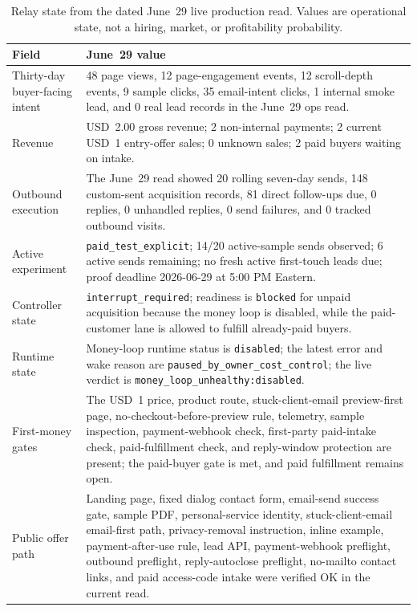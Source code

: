 \documentclass[12pt,letterpaper]{article}
\begin{document}
\begin{table}[tbp]
\centering
\small
\caption{Relay state from the dated June~29 live production read. Values are operational state, not a hiring, market, or profitability probability.}
\label{tab:current_state}
\begin{tabularx}{\textwidth}{L{0.27\textwidth}Y}
\toprule
{}
\textbf{Field} & \textbf{June~29 value} \\
\midrule
Thirty-day buyer-facing intent & 48 page views, 12 page-engagement events, 12 scroll-depth events, 9 sample clicks, 35 email-intent clicks, 1 internal smoke lead, and 0 real lead records in the June~29 ops read. \\
Revenue & USD~2.00 gross revenue; 2 non-internal payments; 2 current USD~1 entry-offer sales; 0 unknown sales; 2 paid buyers waiting on intake. \\
Outbound execution & The June~29 read showed 20 rolling seven-day sends, 148 custom-sent acquisition records, 81 direct follow-ups due, 0 replies, 0 unhandled replies, 0 send failures, and 0 tracked outbound visits. \\
Active experiment & \texttt{paid\_test\_explicit}; 14/20 active-sample sends observed; 6 active sends remaining; no fresh active first-touch leads due; proof deadline 2026-06-29 at 5:00 PM Eastern. \\
Controller state & \texttt{interrupt\_required}; readiness is \texttt{blocked} for unpaid acquisition because the money loop is disabled, while the paid-customer lane is allowed to fulfill already-paid buyers. \\
Runtime state & Money-loop runtime status is \texttt{disabled}; the latest error and wake reason are \texttt{paused\_by\_owner\_cost\_control}; the live verdict is \texttt{money\_loop\_unhealthy:disabled}. \\
First-money gates & The USD~1 price, product route, stuck-client-email preview-first page, no-checkout-before-preview rule, telemetry, sample inspection, payment-webhook check, first-party paid-intake check, paid-fulfillment check, and reply-window protection are present; the paid-buyer gate is met, and paid fulfillment remains open. \\
Public offer path & Landing page, fixed dialog contact form, email-send success gate, sample PDF, personal-service identity, stuck-client-email email-first path, privacy-removal instruction, inline example, payment-after-use rule, lead API, payment-webhook preflight, outbound preflight, reply-autoclose preflight, no-mailto contact links, and paid access-code intake were verified OK in the current read. \\
\bottomrule
\end{tabularx}
\end{table}
\end{document}
